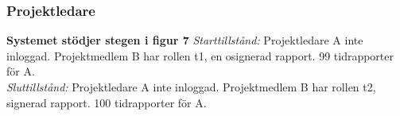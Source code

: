 \documentclass[a4paper]{article}
\begin{document}
\subsubsection{Projektledare}


\begin{ST}
\item 
\textbf{Systemet stödjer stegen i figur 7}
\emph{Starttillstånd:} Projektledare A inte inloggad. Projektmedlem B har rollen t1, en osignerad rapport. 99 tidrapporter för A.\\
\emph{Sluttillstånd:} Projektledare A inte inloggad. Projektmedlem B har rollen t2, signerad rapport. 100 tidrapporter för A.\\

\begin{enumerate}


\end{enumerate}
\end{ST}
\end{document}
